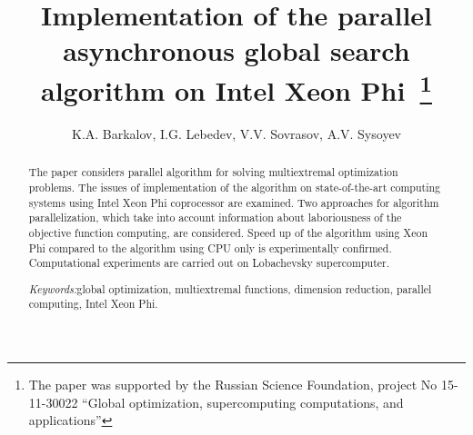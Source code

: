 \documentclass[a4paper]{article}
\begin{document}
\title{Implementation of the parallel asynchronous global search algorithm on Intel Xeon Phi\
\footnote{
The paper was supported by the Russian Science Foundation, project No 15-11-30022 “Global optimization, supercomputing  computations, and applications”}}
\author{K.A. Barkalov, I.G. Lebedev, V.V. Sovrasov, A.V. Sysoyev}
\date{}
\maketitle

\begin{abstract}
The paper considers parallel algorithm for solving multiextremal optimization problems. The issues of implementation of the algorithm on state-of-the-art computing systems using Intel Xeon Phi coprocessor are examined. Two approaches for algorithm parallelization, which take into account information about laboriousness of the objective function computing, are considered. Speed up of the algorithm using Xeon Phi compared to the algorithm using CPU only is experimentally confirmed. Computational experiments are carried out on Lobachevsky supercomputer.
\par
\textit{Keywords:}global optimization, multiextremal functions, dimension reduction, parallel computing, Intel Xeon Phi.
\end{abstract}
\nocite{*}

\end{document}
